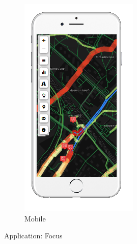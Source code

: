 \begin{figure}[ht]
\begin{subfigure}[b]{0.2\textwidth}
    \includegraphics[width=\textwidth]
      {img/c03-merge/png/mobile-basemap-merge.png}
    \caption{Mobile}
  \end{subfigure}
  \caption{Application: Focus}
\end{figure}
